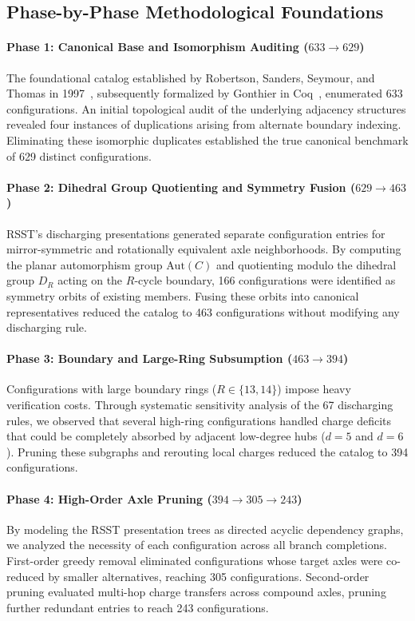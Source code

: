 \documentclass[11pt,a4paper]{article}
\theoremstyle{plain}
\theoremstyle{definition}
\begin{document}
\subsection{Phase-by-Phase Methodological Foundations}

\paragraph{Phase 1: Canonical Base and Isomorphism Auditing ($633 \to 629$)}
The foundational catalog established by Robertson, Sanders, Seymour, and Thomas in 1997~\cite{robertson1997four}, subsequently formalized by Gonthier in Coq~\cite{gonthier2008formal}, enumerated 633 configurations. An initial topological audit of the underlying adjacency structures revealed four instances of duplications arising from alternate boundary indexing. Eliminating these isomorphic duplicates established the true canonical benchmark of 629 distinct configurations.

\paragraph{Phase 2: Dihedral Group Quotienting and Symmetry Fusion ($629 \to 463$)}
RSST's discharging presentations generated separate configuration entries for mirror-symmetric and rotationally equivalent axle neighborhoods. By computing the planar automorphism group $\text{Aut}(C)$ and quotienting modulo the dihedral group $D_R$ acting on the $R$-cycle boundary, 166 configurations were identified as symmetry orbits of existing members. Fusing these orbits into canonical representatives reduced the catalog to 463 configurations without modifying any discharging rule.

\paragraph{Phase 3: Boundary and Large-Ring Subsumption ($463 \to 394$)}
Configurations with large boundary rings ($R \in \{13, 14\}$) impose heavy verification costs. Through systematic sensitivity analysis of the 67 discharging rules, we observed that several high-ring configurations handled charge deficits that could be completely absorbed by adjacent low-degree hubs ($d=5$ and $d=6$). Pruning these subgraphs and rerouting local charges reduced the catalog to 394 configurations.

\paragraph{Phase 4: High-Order Axle Pruning ($394 \to 305 \to 243$)}
By modeling the RSST presentation trees as directed acyclic dependency graphs, we analyzed the necessity of each configuration across all branch completions. First-order greedy removal eliminated configurations whose target axles were co-reduced by smaller alternatives, reaching 305 configurations. Second-order pruning evaluated multi-hop charge transfers across compound axles, pruning further redundant entries to reach 243 configurations.
\end{document}
